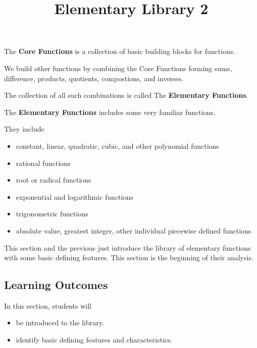 \documentclass{ximera}
\title{Elementary Library 2}
\begin{document}
\begin{abstract}
\end{abstract}
\maketitle



The \textbf{Core Functions} is a collection of basic building blocks for functions.

We build other functions by combining the Core Functions forming sums, difference, products, quotients, compostions, and inverses. 

The collection of all such combinations is called The \textbf{Elementary Functions}.

The \textbf{Elementary Functions} includes some very familiar functions.

They include 

\begin{itemize}
\item constant, linear, quadratic, cubic, and other polynomial functions
\item rational functions
\item root or radical functions
\item exponential and logarithmic functions
\item trigonometric functions
\item absolute value, greatest integer, other individual piecewise defined functions
\end{itemize}



This section and the previous just introduce the library of elementary functions with some basic defining features.  This section is the beginning of their analysis.






\subsection*{Learning Outcomes}

\begin{sectionOutcomes}
In this section, students will 

\begin{itemize}
\item be introduced to the library.
\item identify basic defining features and characteristics.
\end{itemize}
\end{sectionOutcomes}
\end{document}
